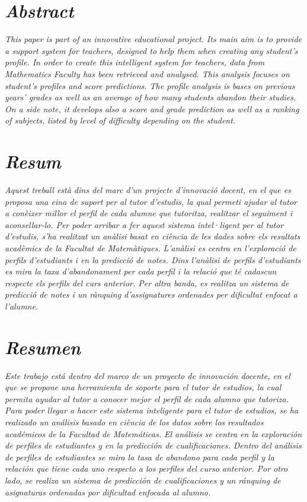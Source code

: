 \documentclass[12pt,a4paper,catalan]{article}
\begin{document}

\section*{\textit{Abstract}}
\textit{This paper is part of an innovative educational project. Its main aim is to provide a support system for teachers, designed to help them when creating any student's profile. In order to create this intelligent system for teachers, data from Mathematics Faculty has been retrieved and analysed. This analysis focuses on student's profiles and score predictions. The profile analysis is bases on previous years' grades as well as an average of how many students abandon their studies. On a side note, it develops also a score and grade prediction as well as a ranking of subjects, listed by level of difficulty depending on the student.}

\section*{\textit{Resum}}
\textit{Aquest treball està dins del marc d'un projecte d'innovació docent, en el que es proposa una eina de suport per al tutor d'estudis, la qual permeti ajudar al tutor a conèixer millor el perfil de cada alumne que tutoritza, realitzar el seguiment i aconsellar-lo. Per poder arribar a fer aquest sistema intel·ligent per al tutor d'estudis, s'ha realitzat un anàlisi basat en ciència de les dades sobre els resultats acadèmics de la Facultat de Matemàtiques. L'anàlisi es centra en l'exploració de perfils d'estudiants i en la predicció de notes. Dins l'anàlisi de perfils d'estudiants es mira la taxa d'abandonament per cada perfil i la relació que té cadascun respecte els perfils del curs anterior. Per altra banda, es realitza un sistema de predicció de notes i un rànquing d'assignatures ordenades per dificultat enfocat a l'alumne.}

\section*{\textit{Resumen}}
\textit{Este trabajo está dentro del marco de un proyecto de innovación docente, en el que se propone una herramienta de soporte para el tutor de estudios, la cual permita ayudar al tutor a conocer mejor el perfil de cada alumno que tutoriza. Para poder llegar a hacer este sistema inteligente para el tutor de estudios, se ha realizado un análisis basado en ciència de los datos sobre los resultados académicos de la Facultad de Matemáticas. El análisis se centra en la exploración de perfiles de estudiantes y en la predicción de cualificaciones. Dentro del análisis de perfiles de estudiantes se mira la tasa de abandono para cada perfil y la relación que tiene cada uno respecto a los perfiles del curso anterior. Por otro lado, se realiza un sistema de predicción de cualificaciones y un ránquing de asignaturas ordenadas por dificultad enfocada al alumno.}
\end{document}
